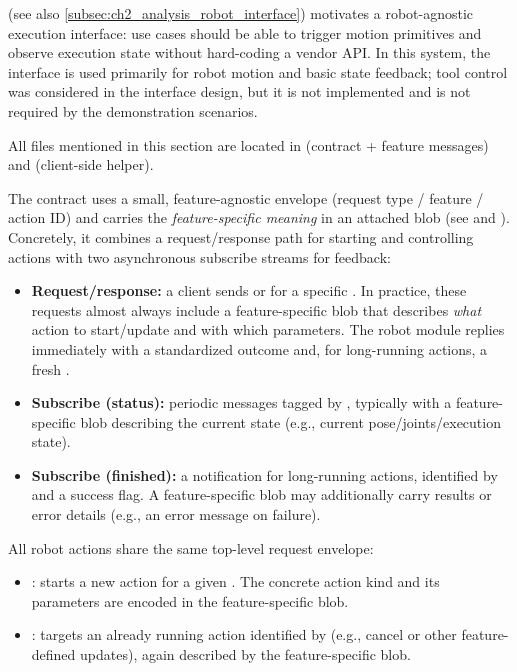  (see also \autoref{subsec:ch2_analysis_robot_interface}) motivates a robot-agnostic execution interface: use cases should be able to trigger motion primitives and observe execution state without hard-coding a vendor API. In this system, the interface is used primarily for robot motion and basic state feedback; tool control was considered in the interface design, but it is not implemented and is not required by the demonstration scenarios.

All files mentioned in this section are located in  (contract + feature messages) and  (client-side helper).

The contract uses a small, feature-agnostic envelope (request type / feature / action ID) and carries the \emph{feature-specific meaning} in an attached blob (see  and ). Concretely, it combines a request/response path for starting and controlling actions with two asynchronous subscribe streams for feedback:
\begin{itemize}
    \item \textbf{Request/response:} a client sends  or  for a specific . In practice, these requests almost always include a feature-specific blob that describes \emph{what} action to start/update and with which parameters. The robot module replies immediately with a standardized outcome and, for long-running actions, a fresh .
    \item \textbf{Subscribe (status):} periodic  messages tagged by , typically with a feature-specific blob describing the current state (e.g., current pose/joints/execution state).
    \item \textbf{Subscribe (finished):} a  notification for long-running actions, identified by  and a success flag. A feature-specific blob may additionally carry results or error details (e.g., an error message on failure).
\end{itemize}

All robot actions share the same top-level request envelope:
\begin{itemize}
    \item {}: starts a new action for a given . The concrete action kind and its parameters are encoded in the feature-specific blob.
    \item {}: targets an already running action identified by  (e.g., cancel or other feature-defined updates), again described by the feature-specific blob.
\end{itemize}

